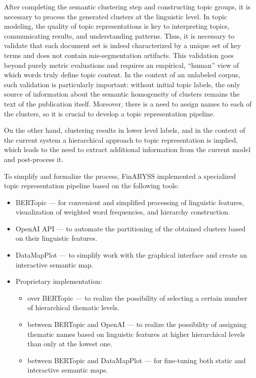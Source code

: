 After completing the semantic clustering step and constructing topic groups,
it is necessary to process the generated clusters at the linguistic level.
In topic modeling, the quality of topic representations is key to interpreting
topics, communicating results, and understanding patterns. Thus, it is necessary
to validate that each document set is indeed characterized by a unique set of key
terms and does not contain mis-segmentation artifacts. This validation goes beyond
purely metric evaluations and requires an empirical, “human” view of which words
truly define topic content. In the context of an unlabeled corpus, such validation
is particularly important: without initial topic labels, the only source of information
about the semantic homogeneity of clusters remains the text of the publication itself.
Moreover, there is a need to assign names to each of the clusters, so it is crucial
to develop a topic representation pipeline.

On the other hand, clustering results in lower level labels, and in the context
of the current system a hierarchical approach to topic representation is implied,
which leads to the need to extract additional information from the current model
and post-process it.

To simplify and formalize the process, FinABYSS implemented a specialized topic
representation pipeline based on the following tools:

\begin{itemize}
    \item BERTopic --- for convenient and simplified processing of linguistic features,
    visualization of weighted word frequencies, and hierarchy construction.
    \item OpenAI API — to automate the partitioning of the obtained clusters based
    on their linguistic features.
    \item DataMapPlot — to simplify work with the graphical interface and create
    an interactive semantic map.
    \item Proprietary implementation:
    \begin{itemize}
        \item over BERTopic — to realize the possibility of selecting a certain number
        of hierarchical thematic levels.
        \item between BERTopic and OpenAI — to realize the possibility of assigning thematic
        names based on linguistic features at higher hierarchical levels than only
        at the lowest one.
        \item between BERTopic and DataMapPlot — for fine-tuning both static and interactive
        semantic maps.
    \end{itemize}
\end{itemize}

